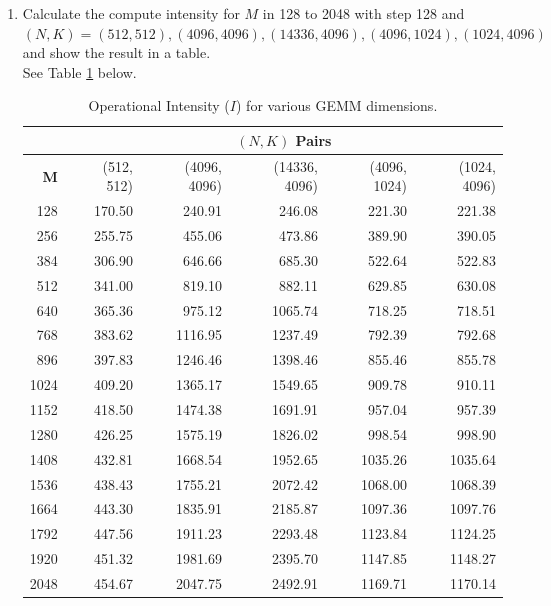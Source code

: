 \documentclass[12pt]{article}
\begin{document}
\begin{enumerate}[label=\textbf{Q\arabic*.}]
\begin{enumerate}
        \item Calculate the compute intensity for $M$ in 128 to 2048 with step 128 and $(N, K) = (512, 512), (4096, 4096), (14336, 4096), (4096, 1024), (1024, 4096)$ and show the result in a table. \\

        See Table \ref{tab:gemm_intensity} below.
        \begin{table}[H]
            \centering
            \caption{Operational Intensity ($I$) for various GEMM dimensions.}
            \label{tab:gemm_intensity}
            \begin{tabular}{r | r| r| r| r| r}
             & \multicolumn{5}{c}{$(N, K)$ Pairs} \\
            \hline
            \textbf{M} & (512, 512) & (4096, 4096) & (14336, 4096) & (4096, 1024) & (1024, 4096) \\
            \hline
128 & 170.50 & 240.91 & 246.08 & 221.30 & 221.38 \\
256 & 255.75 & 455.06 & 473.86 & 389.90 & 390.05 \\
384 & 306.90 & 646.66 & 685.30 & 522.64 & 522.83 \\
512 & 341.00 & 819.10 & 882.11 & 629.85 & 630.08 \\
640 & 365.36 & 975.12 & 1065.74 & 718.25 & 718.51 \\
768 & 383.62 & 1116.95 & 1237.49 & 792.39 & 792.68 \\
896 & 397.83 & 1246.46 & 1398.46 & 855.46 & 855.78 \\
1024 & 409.20 & 1365.17 & 1549.65 & 909.78 & 910.11 \\
1152 & 418.50 & 1474.38 & 1691.91 & 957.04 & 957.39 \\
1280 & 426.25 & 1575.19 & 1826.02 & 998.54 & 998.90 \\
1408 & 432.81 & 1668.54 & 1952.65 & 1035.26 & 1035.64 \\
1536 & 438.43 & 1755.21 & 2072.42 & 1068.00 & 1068.39 \\
1664 & 443.30 & 1835.91 & 2185.87 & 1097.36 & 1097.76 \\
1792 & 447.56 & 1911.23 & 2293.48 & 1123.84 & 1124.25 \\
1920 & 451.32 & 1981.69 & 2395.70 & 1147.85 & 1148.27 \\
2048 & 454.67 & 2047.75 & 2492.91 & 1169.71 & 1170.14
            \end{tabular}
        \end{table}


\end{enumerate}
\end{enumerate}
\end{document}
